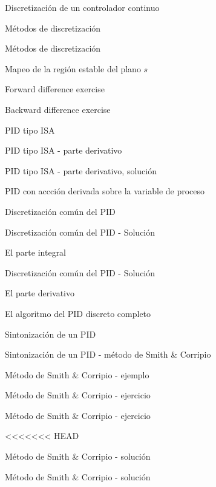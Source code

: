 \documentclass[presentation,aspectratio=1610]{beamer}
\begin{document}
\begin{frame}[label={sec:org86d23da}]{Discretización de un controlador continuo}
\begin{frame}[label={sec:org3ca2082}]{Métodos de discretización}
\begin{frame}[label={sec:orga78cff2}]{Métodos de discretización}
\begin{frame}[label={sec:org28bff53}]{Mapeo de la región estable del plano \(s\)}
\begin{frame}[label={sec:org9bb57fa}]{Forward difference exercise}
\begin{frame}[label={sec:orgaf8c1b0}]{Backward difference exercise}
\begin{frame}[label={sec:orgb2215e6}]{PID tipo ISA}
\begin{frame}[label={sec:orga06296a}]{PID tipo ISA - parte derivativo}
\begin{frame}[label={sec:org978e098}]{PID tipo ISA - parte derivativo, solución}
\begin{frame}[label={sec:orgf3b475b}]{PID con accción derivada sobre la variable de proceso}
\begin{frame}[label={sec:org5c3258e}]{Discretización común del PID}
\begin{frame}[label={sec:org95130b5}]{Discretización común del PID - Solución}
\begin{block}{El parte integral}
\begin{frame}[label={sec:org35f72c2}]{Discretización común del PID - Solución}
\begin{block}{El parte derivativo}
\begin{frame}[label={sec:org34749bc}]{El algoritmo del PID discreto completo}
\begin{frame}[label={sec:orgaefa60b}]{Sintonización de un PID}
\begin{frame}[label={sec:orge6db74e}]{Sintonización de un PID - método de Smith \& Corripio}
\begin{frame}[label={sec:org7d7b902}]{Método de Smith \& Corripio - ejemplo}
\begin{frame}[label={sec:org7c57aa3}]{Método de Smith \& Corripio - ejercicio}
\begin{frame}[label={sec:org958c750}]{Método de Smith \& Corripio - ejercicio}
\begin{center}
\end{center}
\end{frame}

<<<<<<< HEAD
\begin{frame}[label={sec:org1c8ced3}]{Método de Smith \& Corripio - solución}
\end{frame}
\begin{frame}[label={sec:orgd1b31bc}]{Método de Smith \& Corripio - solución}
\def\uampl{0.5}
\def\ttdelay{0.3}
\def\TTcnst{1.6}
\def\ggain{3}
\def\tdelay{1.125} %
\def\Tcnst{2.625} %


\end{frame}
\end{frame}
\end{frame}
\end{frame}
\end{frame}
\end{frame}
\end{block}
\end{frame}
\end{block}
\end{frame}
\end{frame}
\end{frame}
\end{frame}
\end{frame}
\end{frame}
\end{frame}
\end{frame}
\end{frame}
\end{frame}
\end{frame}
\end{frame}
\end{document}
